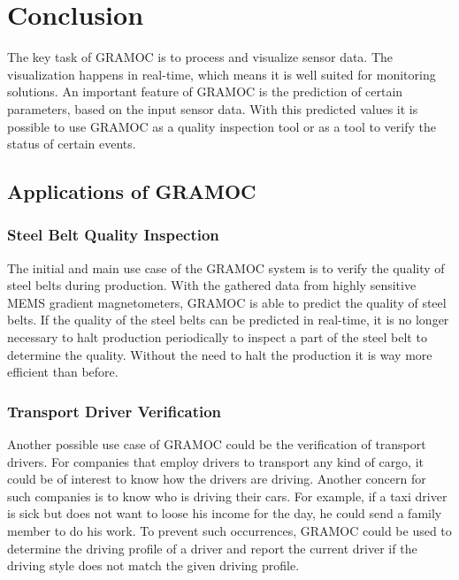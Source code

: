 \chapter{Conclusion}
\label{ch:conclusion}
The key task of GRAMOC is to process and visualize sensor data. The visualization happens in real-time, which means it is well suited for monitoring solutions. An important feature of GRAMOC is the prediction of certain parameters, based on the input sensor data. With this predicted values it is possible to use GRAMOC as a quality inspection tool or as a tool to verify the status of certain events.

\section{Applications of GRAMOC}

\subsection{Steel Belt Quality Inspection}
The initial and main use case of the GRAMOC system is to verify the quality of steel belts during production. With the gathered data from highly sensitive MEMS gradient magnetometers, GRAMOC is able to predict the quality of steel belts. If the quality of the steel belts can be predicted in real-time, it is no longer necessary to halt production periodically to inspect a part of the steel belt to determine the quality. Without the need to halt the production it is way more efficient than before.

\subsection{Transport Driver Verification}
Another possible use case of GRAMOC could be the verification of transport drivers. For companies that employ drivers to transport any kind of cargo, it could be of interest to know how the drivers are driving. Another concern for such companies is to know who is driving their cars. For example, if a taxi driver is sick but does not want to loose his income for the day, he could send a family member to do his work. To prevent such occurrences, GRAMOC could be used to determine the driving profile of a driver and report the current driver if the driving style does not match the given driving profile.

